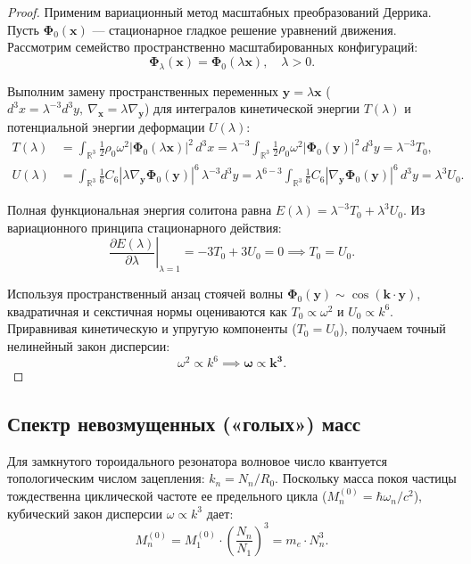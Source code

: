 \documentclass[12pt,a4paper]{article}
\begin{document}
	\begin{proof}
		Применим вариационный метод масштабных преобразований Деррика. Пусть $\boldsymbol{\Phi}_0(\mathbf{x})$ --- стационарное гладкое решение уравнений движения. Рассмотрим семейство пространственно масштабированных конфигураций:
		\begin{equation}
			\boldsymbol{\Phi}_\lambda(\mathbf{x}) = \boldsymbol{\Phi}_0(\lambda \mathbf{x}), \quad \lambda > 0.
		\end{equation}
		
		Выполним замену пространственных переменных $\mathbf{y} = \lambda \mathbf{x}$ ($d^3x = \lambda^{-3} d^3y, \ \nabla_\mathbf{x} = \lambda \nabla_\mathbf{y}$) для интегралов кинетической энергии $T(\lambda)$ и потенциальной энергии деформации $U(\lambda)$:
		\begin{align}
			T(\lambda) &= \int_{\mathbb{R}^3} \frac{1}{2} \rho_0 \omega^2 |\boldsymbol{\Phi}_0(\lambda \mathbf{x})|^2 \, d^3x = \lambda^{-3} \int_{\mathbb{R}^3} \frac{1}{2} \rho_0 \omega^2 |\boldsymbol{\Phi}_0(\mathbf{y})|^2 \, d^3y = \lambda^{-3} T_0, \\
			U(\lambda) &= \int_{\mathbb{R}^3} \frac{1}{6} C_6 |\lambda \nabla_\mathbf{y} \boldsymbol{\Phi}_0(\mathbf{y})|^6 \, \lambda^{-3} d^3y = \lambda^{6 - 3} \int_{\mathbb{R}^3} \frac{1}{6} C_6 |\nabla_\mathbf{y} \boldsymbol{\Phi}_0(\mathbf{y})|^6 \, d^3y = \lambda^3 U_0.
		\end{align}
		
		Полная функциональная энергия солитона равна $E(\lambda) = \lambda^{-3} T_0 + \lambda^3 U_0$. 
		Из вариационного принципа стационарного действия:
		\begin{equation}
			\left. \frac{\partial E(\lambda)}{\partial \lambda} \right|_{\lambda=1} = -3 T_0 + 3 U_0 = 0 \implies T_0 = U_0.
		\end{equation}
		
		Используя пространственный анзац стоячей волны $\boldsymbol{\Phi}_0(\mathbf{y}) \sim \cos(\mathbf{k} \cdot \mathbf{y})$, квадратичная и секстичная нормы оцениваются как $T_0 \propto \omega^2$ и $U_0 \propto k^6$. Приравнивая кинетическую и упругую компоненты ($T_0 = U_0$), получаем точный нелинейный закон дисперсии:
		\begin{equation}
			\omega^2 \propto k^6 \implies \mathbf{\omega \propto k^3}.
		\end{equation}
	\end{proof}
	
	\subsection{Спектр невозмущенных («голых») масс}
	Для замкнутого тороидального резонатора волновое число квантуется топологическим числом зацепления: $k_n = N_n / R_0$. Поскольку масса покоя частицы тождественна циклической частоте ее предельного цикла ($M_n^{(0)} = \hbar \omega_n / c^2$), кубический закон дисперсии $\omega \propto k^3$ дает:
	\begin{equation}
		M_n^{(0)} = M_1^{(0)} \cdot \left( \frac{N_n}{N_1} \right)^3 = m_e \cdot N_n^3.
	\end{equation}
	
\end{document}
